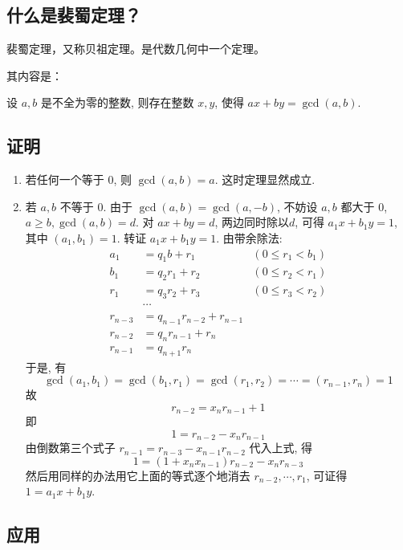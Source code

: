 
\subsection{什么是裴蜀定理？}

裴蜀定理，又称贝祖定理。是代数几何中一个定理。

其内容是：

设 $a,b$ 是不全为零的整数, 则存在整数 $x,y$, 使得 $ax+by=\gcd(a,b)$.

\subsection{证明}

\begin{enumerate}
\item 若任何一个等于 $0$, 则 $\gcd(a,b)=a$. 这时定理显然成立.
\item 若 $a,b$ 不等于 $0$.
由于 $\gcd(a,b)=\gcd(a,-b)$,
不妨设 $a,b$ 都大于 $0$, $a\geq b,\gcd(a,b)=d$.
对 $ax+by=d$, 两边同时除以$d$, 可得 $a_1x+b_1y=1$, 其中 $(a_1,b_1)=1$.
转证 $a_1x+b_1y=1$. 由带余除法:
$$
\begin{align*}a_1 &= q_1b+r_1 &(0\leq r_1<b_1) \\ b_1 &= q_2r_1+r_2 &(0\leq r_2<r_1) \\ r_1 &= q_3r_2+r_3 &(0\leq r_3<r_2) \\ &\cdots \\ r_{n-3} &= q_{n-1}r_{n-2}+r_{n-1} \\ r_{n-2} &= q_nr_{n-1}+r_n \\ r_{n-1} &= q_{n+1}r_n\end{align*}
$$
于是, 有
$$
\gcd(a_1,b_1)=\gcd(b_1,r_1)=\gcd(r_1,r_2)=\cdots=(r_{n-1},r_n)=1
$$
故
$$
r_{n-2}=x_nr_{n-1}+1
$$
即
$$
1=r_{n-2}-x_nr_{n-1}
$$
由倒数第三个式子 $r_{n-1}=r_{n-3}-x_{n-1}r_{n-2}$ 代入上式, 得
$$
1=(1+x_nx_{n-1})r_{n-2}-x_nr_{n-3}
$$
然后用同样的办法用它上面的等式逐个地消去 $r_{n-2},\cdots,r_1$,
可证得 $1=a_1x+b_1y$.
\end{enumerate}

\subsection{应用}



